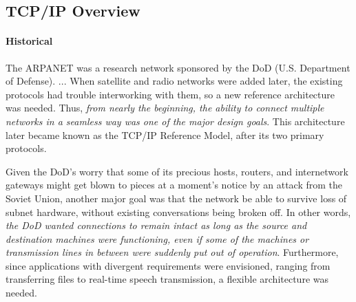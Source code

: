 \mode*
{}

\subsection{TCP/IP Overview}

\paragraph{Historical}

  The ARPANET was a research network sponsored by the DoD (U.S. Department of
  Defense). ...  When satellite and radio networks were added later, the existing
  protocols had trouble interworking with them, so a new reference architecture was
  needed. Thus, \emph{from nearly the beginning, the ability to connect multiple networks in
    a seamless way was one of the major design goals}.  This architecture later became
  known as the TCP/IP Reference Model, after its two primary protocols. 

  Given the DoD's worry that some of its precious hosts, routers, and internetwork
  gateways might get blown to pieces at a moment's notice by an attack from the Soviet
  Union, another major goal was that the network be able to survive loss of subnet
  hardware, without existing conversations being broken off. In other words, \emph{the DoD
    wanted connections to remain intact as long as the source and destination machines
    were functioning, even if some of the machines or transmission lines in between were
    suddenly put out of operation}. Furthermore, since applications with divergent
  requirements were envisioned, ranging from transferring files to real-time speech
  transmission, a flexible architecture was needed.


